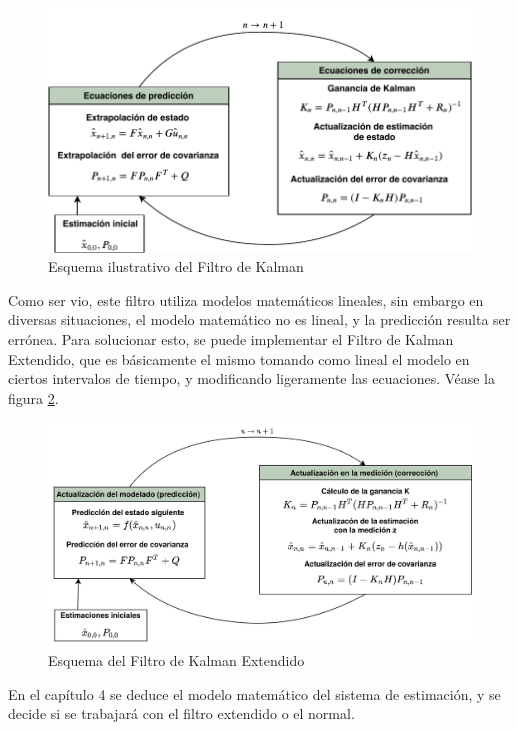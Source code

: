 \begin{figure}
\centering
\includegraphics[scale=0.7]{images/kalman_algorithm.pdf}
\caption{Esquema ilustrativo del Filtro de Kalman}
\label{fig:Kalman_scheme}
\end{figure}

	Como ser vio, este filtro utiliza modelos matemáticos lineales, sin embargo en diversas situaciones, el modelo matemático no es lineal, y la predicción resulta ser errónea. Para solucionar esto, se puede implementar el Filtro de Kalman Extendido, que es básicamente el mismo tomando como lineal el modelo en ciertos intervalos de tiempo, y modificando ligeramente las ecuaciones. Véase la figura \ref{fig:extended_kalman_scheme}.

\begin{figure}
\centering
\includegraphics[scale=0.05]{images/extended_kalman_algorithm.png}
\caption{Esquema del Filtro de Kalman Extendido}
\label{fig:extended_kalman_scheme}
\end{figure}

En el capítulo 4 se deduce el modelo matemático del sistema de estimación, y se decide si se trabajará con el filtro extendido o el normal. 

